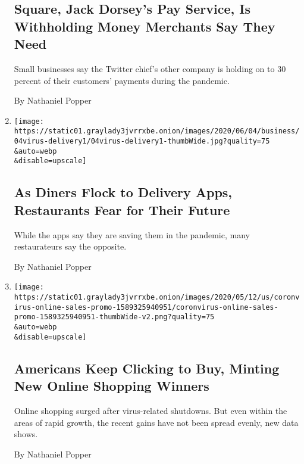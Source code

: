 \begin{enumerate}
{  \subsection{Square, Jack Dorsey's Pay Service, Is Withholding Money
  Merchants Say They
  Need}\label{square-jack-dorseys-pay-service-is-withholding-money-merchants-say-they-need}}

  Small businesses say the Twitter chief's other company is holding on
  to 30 percent of their customers' payments during the pandemic.

  By Nathaniel Popper
\item
  \href{/2020/06/09/technology/delivery-apps-restaurants-fees-virus.html}{}

  \texttt{[image: https://static01.graylady3jvrrxbe.onion/images/2020/06/04/business/04virus-delivery1/04virus-delivery1-thumbWide.jpg?quality=75\\\&auto=webp\\\&disable=upscale]}

  \hypertarget{as-diners-flock-to-delivery-apps-restaurants-fear-for-their-future}{%
  \subsection{As Diners Flock to Delivery Apps, Restaurants Fear for
  Their
  Future}\label{as-diners-flock-to-delivery-apps-restaurants-fear-for-their-future}}

  While the apps say they are saving them in the pandemic, many
  restaurateurs say the opposite.

  By Nathaniel Popper
\item
  \href{/interactive/2020/05/13/technology/online-shopping-buying-sales-coronavirus.html}{}

  \texttt{[image: https://static01.graylady3jvrrxbe.onion/images/2020/05/12/us/coronvirus-online-sales-promo-1589325940951/coronvirus-online-sales-promo-1589325940951-thumbWide-v2.png?quality=75\\\&auto=webp\\\&disable=upscale]}

  \hypertarget{americans-keep-clicking-to-buy-minting-new-online-shopping-winners}{%
  \subsection{Americans Keep Clicking to Buy, Minting New Online
  Shopping
  Winners}\label{americans-keep-clicking-to-buy-minting-new-online-shopping-winners}}

  Online shopping surged after virus-related shutdowns. But even within
  the areas of rapid growth, the recent gains have not been spread
  evenly, new data shows.

  By Nathaniel Popper
\end{enumerate}

